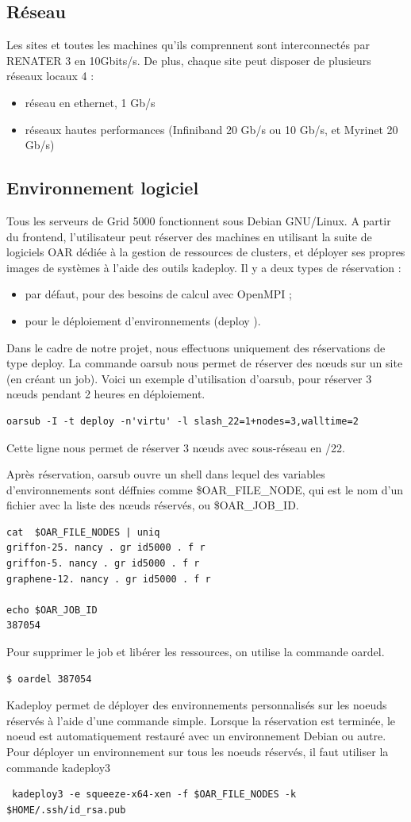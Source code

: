 \subsection{Réseau}
Les sites et toutes les machines qu'ils comprennent sont interconnectés par RENATER 3 en 10Gbits/s. De
plus, chaque site peut disposer de plusieurs réseaux locaux 4 :
\begin{itemize}
\item réseau en ethernet, 1 Gb/s
\item réseaux hautes performances (Infiniband 20 Gb/s ou 10 Gb/s, et Myrinet 20 Gb/s)
\end{itemize}

  \subsection{Environnement logiciel}
Tous les serveurs de Grid 5000 fonctionnent sous Debian GNU/Linux.
A partir du frontend, l'utilisateur peut réserver des machines en utilisant la suite de logiciels OAR dédiée à
la gestion de ressources de clusters, et déployer ses propres images de systèmes à l'aide des outils kadeploy.
Il y a deux types de réservation :
\begin{itemize}
\item par défaut, pour des besoins de calcul avec OpenMPI ;
\item pour le déploiement d'environnements (deploy ).
\end{itemize}
Dans le cadre de notre projet, nous effectuons uniquement des réservations de type deploy. La commande oarsub nous permet de réserver des nœuds sur un site (en créant un job). Voici un exemple d'utilisation d'oarsub, pour réserver 3 nœuds pendant 2 heures en déploiement.
\begin{lstlisting}
oarsub -I -t deploy -n'virtu' -l slash_22=1+nodes=3,walltime=2
\end{lstlisting}
Cette ligne nous permet de réserver 3 nœuds avec sous-réseau en /22.

Après réservation, oarsub ouvre un shell dans lequel des variables d'environnements sont déffnies comme \$OAR\_FILE\_NODE, qui est le nom d'un fichier avec la liste des nœuds réservés, ou \$OAR\_JOB\_ID.
\begin{lstlisting}
cat  $OAR_FILE_NODES | uniq
griffon-25. nancy . gr id5000 . f r
griffon-5. nancy . gr id5000 . f r
graphene-12. nancy . gr id5000 . f r

echo $OAR_JOB_ID
387054
\end{lstlisting}
Pour supprimer le job et libérer les ressources, on utilise la commande oardel.
\begin{lstlisting}
$ oardel 387054
\end{lstlisting}
Kadeploy permet de déployer des environnements personnalisés sur les noeuds réservés à l'aide d'une commande simple. Lorsque la réservation est terminée, le noeud est automatiquement restauré avec un environnement Debian ou autre.
Pour déployer un environnement sur tous les noeuds réservés, il faut utiliser la commande kadeploy3
\begin{lstlisting}
 kadeploy3 -e squeeze-x64-xen -f $OAR_FILE_NODES -k $HOME/.ssh/id_rsa.pub
\end{lstlisting}

